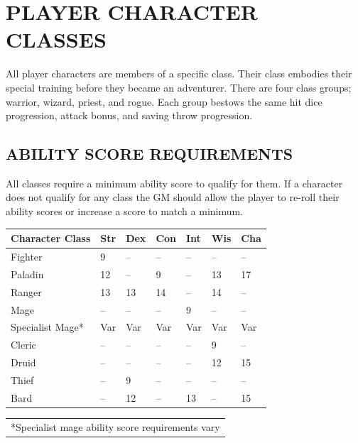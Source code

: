 \chapter{PLAYER CHARACTER CLASSES}

\begin{multicols}{2}

All player characters are members of a specific class.  Their class embodies their special training before they became an adventurer.  There are four class groups; warrior, wizard, priest, and rogue.  Each group bestows the same hit dice progression, attack bonus, and saving throw progression.

\section{ABILITY SCORE REQUIREMENTS}

All classes require a minimum ability score to qualify for them.  If a character does not qualify for any class the GM should allow the player to re-roll their ability scores or increase a score to match a minimum.

\noindent
\begin{minipage}{\columnwidth}

\label{classreqs}
\noindent
\begin{tabular}{|p{}|m{}|m{}|m{}|m{}|m{}|m{}|}
\hline
Character Class		& Str	& Dex	& Con	& Int	& Wis	& Cha \\
\hline\hline
\rowcolor[gray]{.9}Fighter				& 9		& --	& --	& --	& --	& -- \\
Paladin				& 12	& --	& 9		& --	& 13	& 17 \\
\rowcolor[gray]{.9}Ranger				& 13	& 13	& 14	& --	& 14	& -- \\
Mage				& --	& --	& --	& 9		& --	& -- \\
\rowcolor[gray]{.9}Specialist Mage*	& Var	& Var	& Var	& Var	& Var	& Var \\
Cleric				& --	& --	& --	& --	& 9		& -- \\
\rowcolor[gray]{.9}Druid				& --	& --	& --	& --	& 12	& 15 \\
Thief				& --	& 9		& --	& --	& --	& -- \\
\rowcolor[gray]{.9}Bard				& --	& 12	& --	& 13	& --	& 15 \\
\hline
\end{tabular}
\noindent
\begin{tabular}{p{\columnwidth}}
*Specialist mage ability score requirements vary \\
\end{tabular}\vspace{.5em}


\end{minipage}
\end{multicols}
